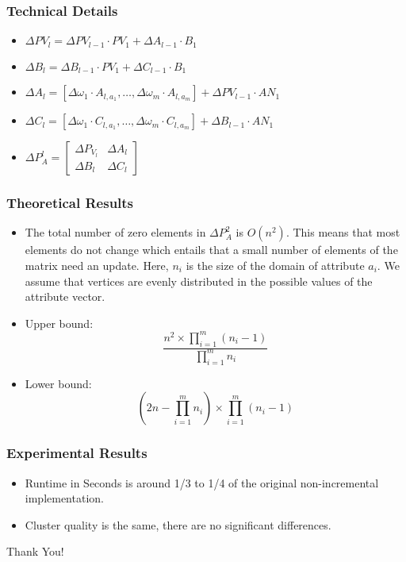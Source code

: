 \documentclass[]{beamer}
\begin{document}
	\begin{frame}
		\frametitle{Technical Details} 
		\begin{itemize}
			\item $\Delta PV_l = \Delta PV_{l-1} \cdot PV_1 + \Delta A_{l-1} \cdot B_1$
			\item $\Delta B_l = \Delta B_{l-1} \cdot PV_1 + \Delta C_{l-1} \cdot B_1$
			\item $\Delta A_l = [\Delta \omega_1 \cdot A_{l,a_1}, \ldots, \Delta \omega_m \cdot A_{l,a_m}] + \Delta PV_{l-1} \cdot AN_{1}$
			\item $\Delta C_l = [\Delta \omega_1 \cdot C_{l,a_1}, \ldots, \Delta \omega_m \cdot C_{l,a_m}] + \Delta B_{l-1} \cdot AN_{1}$
			
			\item $\Delta P_A^l = \begin{bmatrix}
				\Delta P_{V_l} & \Delta A_l \\
				\Delta B_l & \Delta C_l 
			\end{bmatrix}$
		\end{itemize}
	\end{frame}
	\begin{frame}
		\frametitle{Theoretical Results}
		\begin{itemize}
			
		
		\item The total number of zero elements in $\Delta P_A^2$ is $O(n^2)$. This means that most elements do not change which entails that a small number of elements of the matrix need an update. Here, $n_i$ is the size of the domain of attribute $a_i$. We assume that vertices are evenly distributed in the possible values of the attribute vector.
		\item Upper bound: \[
		\frac{n^2 \times \prod_{i=1}^{m} (n_i - 1)}{\prod_{i=1}^{m} n_i}
		\]
		
		\item Lower bound: \[
		\left( 2n - \prod_{i=1}^{m} n_i \right) \times \prod_{i=1}^{m} (n_i - 1)
		\]
	\end{itemize}
	\end{frame}
	\begin{frame}
		\frametitle{Experimental Results}
		\begin{itemize}
		\item Runtime in Seconds is around 1/3 to 1/4 of the original non-incremental implementation.
		\item Cluster quality is the same, there are no significant differences.
	\end{itemize} 
	\end{frame}
	\begin{frame}%
		\begin{center}
			{\fontsize{40}{40}\selectfont Thank You!}
		\end{center}
	\end{frame}
	
\end{document}
